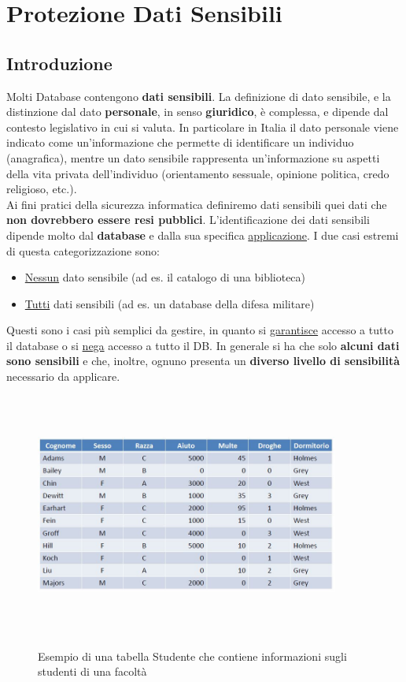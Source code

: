 \chapter{Protezione Dati Sensibili}

\section{Introduzione}
Molti Database contengono \textbf{dati sensibili}. La definizione di dato sensibile, e la distinzione dal dato \textbf{personale}, in senso \textbf{giuridico}, è complessa, e dipende dal contesto legislativo in cui si valuta. In particolare in Italia il dato personale viene indicato come un'informazione che permette di identificare un individuo (anagrafica), mentre un dato sensibile rappresenta un'informazione su aspetti della vita privata dell'individuo (orientamento sessuale, opinione politica, credo religioso, etc.). \\

Ai fini pratici della sicurezza informatica definiremo dati sensibili quei dati che \textbf{non dovrebbero essere resi pubblici}. L'identificazione dei dati sensibili dipende molto dal \textbf{database} e dalla sua specifica \underline{applicazione}. I due casi estremi di questa categorizzazione sono: 
\begin{itemize}
\item \underline{Nessun} dato sensibile (ad es. il catalogo di una biblioteca)
\item \underline{Tutti} dati sensibili (ad es. un database della difesa militare)
\end{itemize}
Questi sono i casi più semplici da gestire, in quanto si \underline{garantisce} accesso a tutto il database o si \underline{nega} accesso a tutto il DB. In generale si ha che solo \textbf{alcuni dati sono sensibili} e che, inoltre, ognuno presenta un \textbf{diverso livello di sensibilità} necessario da applicare.

\begin{figure}[htbp]
	\centering
	{\includegraphics[height=8cm, width=10cm, keepaspectratio]{Immagini/dati_sensibili/prot_dati_01.JPG}}
	\caption{Esempio di una tabella Studente che contiene informazioni sugli studenti di una facoltà\label{fig:tabella_db}}
\end{figure}

